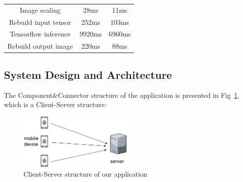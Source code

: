 \documentclass[a4paper,11pt,onecolumn,twoside]{article}
\begin{document}
\begin{CJK*}{GBK}{song}
\begin{table}[H]
\begin{tabular}{ccc}
    Image scaling & 28ms & 11ms\\
    
    Rebuild input tensor & 252ms & 103ms\\
    
    Tensorflow inference & 9920ms & 6960ms\\
    
    Rebuild output image & 220ms & 88ms\\
    \hline
  \end{tabular}
\end{table}



\subsection{System Design and Architecture}


The Component\&Connector structure of the application 
is presented in Fig~\ref{C&C}, which is a Client-Server structure:

\begin{figure}[!htb] %
  \centering %
  \includegraphics[width=0.5\textwidth]{C&C} %
  \caption{Client-Server structure of our application} %
  \label{C&C} %
\end{figure}


\end{CJK*}
\end{document}

